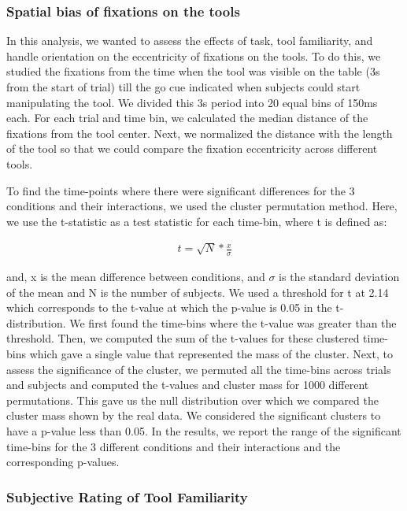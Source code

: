 \subsubsection{ Spatial bias of fixations on the tools}

In this analysis, we wanted to assess the effects of task, tool familiarity, and handle orientation on the eccentricity of fixations on the tools. To do this, we studied the fixations from the time when the tool was visible on the table (3s from the start of trial) till the go cue indicated when subjects could start manipulating the tool. We divided this 3s period into 20 equal bins of 150ms each. For each trial and time bin, we calculated the median distance of the fixations from the tool center. Next, we normalized the distance with the length of the tool so that we could compare the fixation eccentricity across different tools.

To find the time-points where there were significant differences for the 3 conditions and their interactions, we used the cluster permutation method. Here, we use the t-statistic as a test statistic for each time-bin, where t is defined as:


\begin{gather*}\label{eq:cluster_permutation}
 t = \sqrt{N} * \frac{x}{\sigma}
 \end{gather*}

and, x is the mean difference between conditions, and $\sigma$ is the standard deviation of the mean and N is the number of subjects. We used a threshold for t at 2.14 which corresponds to the t-value at which the p-value is 0.05 in the t-distribution. We first found the time-bins where the t-value was greater than the threshold. Then, we computed the sum of the t-values for these clustered time-bins which gave a single value that represented the mass of the cluster. Next, to assess the significance of the cluster, we permuted all the time-bins across trials and subjects and computed the t-values and cluster mass for 1000 different permutations. This gave us the null distribution over which we compared the cluster mass shown by the real data. We considered the significant clusters to have a p-value less than 0.05. In the results, we report the range of the significant time-bins for the 3 different conditions and their interactions and the corresponding p-values. 

\subsubsection{Subjective Rating of Tool Familiarity}

